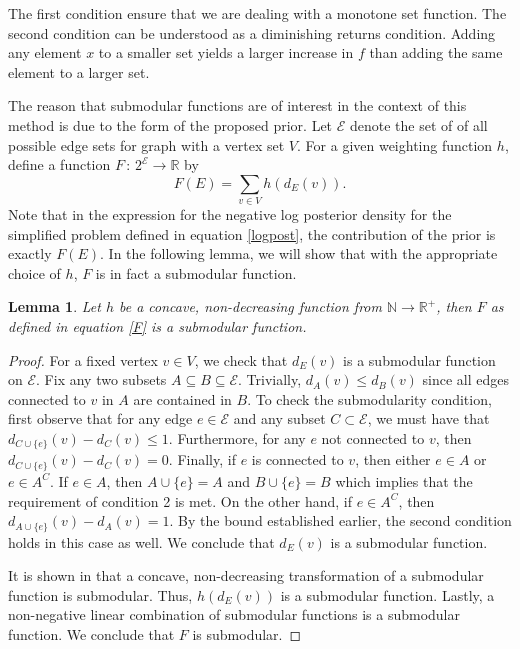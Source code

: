 \documentclass{uwstat572}
\newtheorem{lemma}[theorem]{Lemma}
\theoremstyle{remark}
\theoremstyle{definition}
\begin{document}
The first condition ensure that we are dealing with a monotone set function. The second condition can be understood as a diminishing returns condition.  Adding any element $x$ to a smaller set yields a larger increase in $f$ than adding the same element to a larger set.

The reason that submodular functions are of interest in the context of this method is due to the form of the proposed prior.  Let $\mathcal{E}$ denote the set of of all possible edge sets for graph with a vertex set $V$.  For a given weighting function $h$, define a function $F \, : \, 2^{\mathcal{E}} \to \mathbb{R}$ by
\begin{equation}\label{F}
F(E) = \sum_{v \in V} h(d_E(v)).
\end{equation}
Note that in the expression for the  negative log posterior density for the simplified problem defined in equation \eqref{logpost}, the contribution of the prior is exactly $ F(E)$.  In the following lemma, we will show that with the appropriate choice of $h$, $F$ is in fact a submodular function.

\begin{lemma}
Let $h$ be a concave, non-decreasing function from $\mathbb{N} \to \mathbb{R}^+$, then $F$ as defined in equation \eqref{F} is a submodular function.
\end{lemma}
\begin{proof}
For a fixed vertex $v \in V$, we check that $d_E(v)$ is a submodular function on $\mathcal{E}$.  Fix any two subsets $A \subseteq B \subseteq \mathcal{E}$.  Trivially, $d_A(v) \leq d_B(v)$ since all edges connected to $v$ in $A$ are contained in $B$.  To check the submodularity condition, first observe that for any edge $e \in \mathcal{E}$ and any subset $C \subset \mathcal{E}$, we must have that $d_{C \cup \{e\}}(v) - d_{C}(v) \leq 1$.  Furthermore, for any $e$ not connected to $v$, then $d_{C \cup \{e\}}(v) - d_{C}(v) = 0$.  Finally, if $e$ is connected to $v$, then either $e \in A$ or $e \in A^C$.  If $e \in A$, then $A \cup \{e\} = A$ and $B \cup \{e\} = B$ which implies that the requirement of condition 2 is met.  On the other hand, if $e \in A^C$, then $d_{A \cup \{e\}} (v) - d_A(v) = 1$.  By the bound established earlier, the second condition holds in this case as well.  We conclude that
$d_E(v)$ is a submodular function.

It is shown in \cite{fujishige2005submodular} that a concave, non-decreasing transformation of a submodular function is submodular.  Thus, $h(d_E(v))$ is a submodular function.  Lastly, a non-negative linear combination of submodular functions is a submodular function.  We conclude that $F$ is submodular.
\end{proof}
\end{document}
